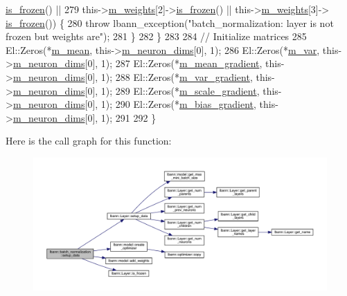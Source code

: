\begin{DoxyCode}
      \hyperlink{classlbann_1_1Layer_af3c0f9f32eb631f4fdf34ad040ef8637}{is\_frozen}() ||
279           this->\hyperlink{classlbann_1_1Layer_a7954e30fbf9100a6ba4b56d02767a469}{m\_weights}[2]->\hyperlink{classlbann_1_1Layer_af3c0f9f32eb631f4fdf34ad040ef8637}{is\_frozen}() || this->\hyperlink{classlbann_1_1Layer_a7954e30fbf9100a6ba4b56d02767a469}{m\_weights}[3]->
      \hyperlink{classlbann_1_1Layer_af3c0f9f32eb631f4fdf34ad040ef8637}{is\_frozen}()) \{
280         \textcolor{keywordflow}{throw} lbann\_exception(\textcolor{stringliteral}{"batch\_normalization: layer is not frozen but weights are"});
281       \}
282     \}
283 
284     \textcolor{comment}{// Initialize matrices}
285     El::Zeros(*\hyperlink{classlbann_1_1batch__normalization_a7c0db2315a4c5bb662da7a740ae76e24}{m\_mean}, this->\hyperlink{classlbann_1_1Layer_abb34bb8031f57a483e2e327a5f229f48}{m\_neuron\_dims}[0], 1);
286     El::Zeros(*\hyperlink{classlbann_1_1batch__normalization_aba533149e4179378ab23443b0a2a7dc6}{m\_var}, this->\hyperlink{classlbann_1_1Layer_abb34bb8031f57a483e2e327a5f229f48}{m\_neuron\_dims}[0], 1);
287     El::Zeros(*\hyperlink{classlbann_1_1batch__normalization_aa4677c2f7d5ea27c53bf0f61f280a2a3}{m\_mean\_gradient}, this->\hyperlink{classlbann_1_1Layer_abb34bb8031f57a483e2e327a5f229f48}{m\_neuron\_dims}[0], 1);
288     El::Zeros(*\hyperlink{classlbann_1_1batch__normalization_aa2d2050a265eed854aa8950cd1461af9}{m\_var\_gradient}, this->\hyperlink{classlbann_1_1Layer_abb34bb8031f57a483e2e327a5f229f48}{m\_neuron\_dims}[0], 1);
289     El::Zeros(*\hyperlink{classlbann_1_1batch__normalization_a66364e1b0c9afb40a4c03ee1869d264c}{m\_scale\_gradient}, this->\hyperlink{classlbann_1_1Layer_abb34bb8031f57a483e2e327a5f229f48}{m\_neuron\_dims}[0], 1);
290     El::Zeros(*\hyperlink{classlbann_1_1batch__normalization_aa0f1e9a9f48f67544618e239167494bb}{m\_bias\_gradient}, this->\hyperlink{classlbann_1_1Layer_abb34bb8031f57a483e2e327a5f229f48}{m\_neuron\_dims}[0], 1);
291 
292   \}
\end{DoxyCode}
Here is the call graph for this function\+:\nopagebreak
\begin{figure}[H]
\begin{center}
\leavevmode
\includegraphics[width=350pt]{classlbann_1_1batch__normalization_ac046a5ab567cc01f9a36c6b0fc4e3b55_cgraph}
\end{center}
\end{figure}
\mbox{\label{classlbann_1_1batch__normalization_ab4737c3efcafa9bff1e68084b7f36283}} 
